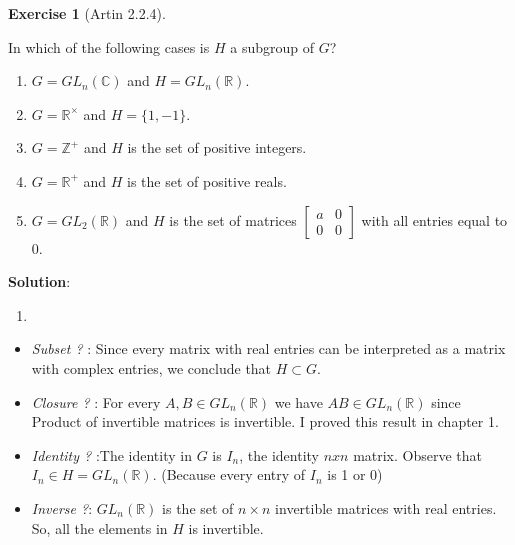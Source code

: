 \documentclass[
]{book}
\providecommand{\tightlist}{%
  \setlength{\itemsep}{0pt}\setlength{\parskip}{0pt}}
\theoremstyle{definition}
\theoremstyle{definition}
\theoremstyle{definition}
\newtheorem{exercise}{Exercise}[chapter]
\theoremstyle{definition}
\theoremstyle{remark}
\begin{document}
\begin{exercise}[Artin 2.2.4]
\protect\hypertarget{exr:unnamed-chunk-93}{}\label{exr:unnamed-chunk-93}

In which of the following cases is \(H\) a subgroup of \(G\)?

\begin{enumerate}
\def\labelenumi{(\alph{enumi})}
\item
  \(G = GL_n(\mathbb{C})\) and \(H = GL_n(\mathbb{R})\).
\item
  \(G = \mathbb{R}^\times\) and \(H = \{1, -1\}\).
\item
  \(G = \mathbb{Z}^+\) and \(H\) is the set of positive integers.
\item
  \(G = \mathbb{R}^+\) and \(H\) is the set of positive reals.
\item
  \(G = GL_2(\mathbb{R})\) and \(H\) is the set of matrices \(\begin{bmatrix} a & 0 \\ 0 & 0 \end{bmatrix}\) with all entries equal to 0.
\end{enumerate}

\end{exercise}

\textbf{Solution}:\\

\begin{enumerate}
\def\labelenumi{(\alph{enumi})}
\tightlist
\item
\end{enumerate}

\begin{itemize}
\item
  \emph{Subset ?} : Since every matrix with real entries can be interpreted as a matrix with complex entries, we conclude that \(H \subset G\).
\item
  \emph{Closure ?} : For every \(A, B \in GL_n(\mathbb{R})\) we have \(AB \in GL_n(\mathbb{R})\) since Product of invertible matrices is invertible. I proved this result in chapter 1.
\item
  \emph{Identity ?} :The identity in \(G\) is \(I_n\), the identity \(n x n\) matrix. Observe that \(I_n\in H=GL_n(\mathbb{R})\). (Because every entry of \(I_n\) is 1 or 0)
\item
  \emph{Inverse ?}: \(GL_n(\mathbb{R})\) is the set of \(n \times n\) invertible matrices with real entries. So, all the elements in \(H\) is invertible.
\end{itemize}
\end{document}
